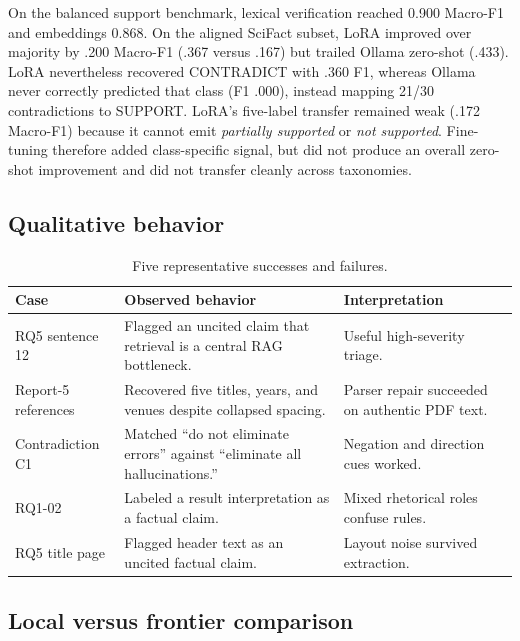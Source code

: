 \documentclass[12pt,toc=bib,toc=listof]{scrartcl}
\begin{document}
On the balanced support benchmark, lexical verification reached 0.900 Macro-F1 and embeddings 0.868. On the aligned SciFact subset, LoRA improved over majority by .200 Macro-F1 (.367 versus .167) but trailed Ollama zero-shot (.433). LoRA nevertheless recovered CONTRADICT with .360 F1, whereas Ollama never correctly predicted that class (F1 .000), instead mapping 21/30 contradictions to SUPPORT. LoRA's five-label transfer remained weak (.172 Macro-F1) because it cannot emit \emph{partially supported} or \emph{not supported}. Fine-tuning therefore added class-specific signal, but did not produce an overall zero-shot improvement and did not transfer cleanly across taxonomies.

\subsection{Qualitative behavior}

\begin{table}[H]
\centering\footnotesize
\begin{tabularx}{\textwidth}{@{}p{2.25cm} Y p{3.35cm}@{}}
\toprule
Case & Observed behavior & Interpretation \\
\midrule
RQ5 sentence 12 & Flagged an uncited claim that retrieval is a central RAG bottleneck. & Useful high-severity triage. \\
Report-5 references & Recovered five titles, years, and venues despite collapsed spacing. & Parser repair succeeded on authentic PDF text. \\
Contradiction C1 & Matched ``do not eliminate errors'' against ``eliminate all hallucinations.'' & Negation and direction cues worked. \\
RQ1-02 & Labeled a result interpretation as a factual claim. & Mixed rhetorical roles confuse rules. \\
RQ5 title page & Flagged header text as an uncited factual claim. & Layout noise survived extraction. \\
\bottomrule
\end{tabularx}
\caption{Five representative successes and failures.}
\label{tab:qualitative}
\end{table}

\subsection{Local versus frontier comparison}
\end{document}
